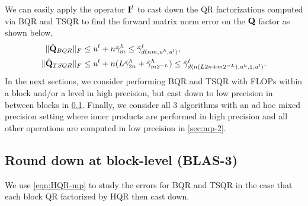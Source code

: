 
We can easily apply the operator $\mathbf{I}^l$ to cast down the QR factorizations computed via BQR and TSQR to find the forward matrix norm error on the $\mathbf{Q}$ factor as shown below,
\begin{align*}
	\|\hat{\mathbf{Q}}_{BQR}\|_F&\leq u^l+n\tilde{\gamma}_m^h \leq \tilde{\gamma}_{d(nm,u^h,u^l)}^l,\\
	\|\hat{\mathbf{Q}}_{TSQR}\|_F&\leq u^l+n(L\tilde{\gamma}_{2n}^h+\tilde{\gamma}_{m2^{-L}}^h) \leq \tilde{\gamma}_{d(n(L2n+m2^{-L}),u^h,1,u^l)}^l.
\end{align*}
In the next sections, we consider performing BQR and TSQR with FLOPs within a block and/or a level in high precision, but cast down to low precision in between blocks in \ref{sec:mp-3}.
Finally, we consider all 3 algorithms with an ad hoc mixed precision setting where inner products are performed in high precision and all other operations are computed in low precision in \ref{sec:mp-2}.
\subsection{Round down at block-level (BLAS-3)}\label{sec:mp-3}
We use \cref{eqn:HQR-mp} to study the errors for BQR and TSQR in the case that each block QR factorized by HQR then cast down.
